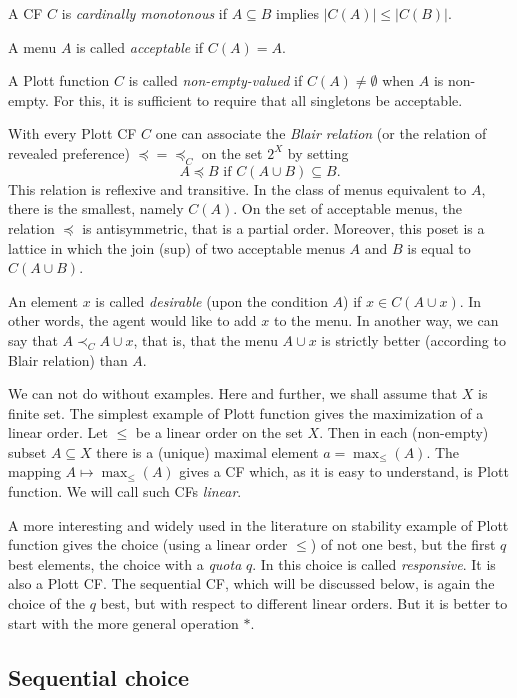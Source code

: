 \documentclass[12pt,a4paper]{article}
\begin{document}
A CF $C$ is \emph{cardinally monotonous} if $A\subseteq B$ implies $|C(A)|\le
|C(B)|$.

A menu $A$ is called \emph{acceptable} if $C(A)=A$.

A Plott function $C$ is called \emph{non-empty-valued} if $C(A)\ne \emptyset$ when $A$ is non-empty. For this, it is sufficient to require that all singletons be acceptable.

With every Plott CF $C$ one can associate the \emph{Blair relation} (or the relation of revealed preference) $\preceq =\preceq _C$ on the set $2^X$ by setting
\begin{equation}\label{Bla}
      A\preceq B \text{ if } C(A\cup B)\subseteq B.
\end{equation}
This relation is reflexive and transitive. In the class of menus equivalent to $A$, there is the smallest, namely $C(A)$. %
On the set of acceptable menus, the relation $\preceq$ is antisymmetric, that is a partial order. Moreover, this poset is a lattice in which the join (sup) of two acceptable menus $A$ and $B$ is equal to $C(A\cup B)$.

An element $x$ is called \emph{desirable} (upon the condition $A$) if $x\in C(A\cup x)$. In other words, the agent would like to add $x$ to the menu. In another way, we can say that $A\prec_C A\cup x$, that is, that the menu $A\cup x$ is strictly better (according to Blair relation) than $A$.

We can not do without examples. Here and further, we shall assume that $X$ is finite set. The simplest example of Plott function gives the maximization of a linear order. Let $\le$ be a linear order on the set $X$. Then in each (non-empty) subset $A\subseteq X$ there is a (unique) maximal element $a=\max_\le(A)$. The mapping $A \mapsto  \max_\le(A)$ gives a CF which, as it is easy to understand, is Plott function. We will call such CFs \emph{linear}.

A more interesting and widely used in the literature on stability example of Plott function gives the choice (using a linear order $\le$) of not one best, but the first $q$ best elements, the choice with a \emph{quota} $q$. In \cite{CY} this choice is called \emph{responsive}. It is also a Plott CF. The sequential CF, which will be discussed below, is again the choice of the $q$ best, but with respect to different linear orders. But it is better to start with the more general operation $*$.

\subsection{Sequential choice}
\end{document}

